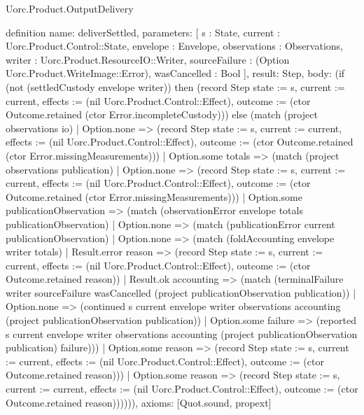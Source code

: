\begin{lexlean}{Uorc.Product.OutputDelivery}
\begin{semanticmodule}
definition{
  name: deliverSettled,
  parameters: [
    s : State,
    current : Uorc.Product.Control::State,
    envelope : Envelope,
    observations : Observations,
    writer : Uorc.Product.ResourceIO::Writer,
    sourceFailure : (Option Uorc.Product.WriteImage::Error),
    wasCancelled : Bool
  ],
  result: Step,
  body: (if (not (settledCustody envelope writer)) then (record Step {state := s, current := current, effects := (nil Uorc.Product.Control::Effect), outcome := (ctor Outcome.retained (ctor Error.incompleteCustody))}) else (match (project observations io)
    | Option.none => (record Step {state := s, current := current, effects := (nil Uorc.Product.Control::Effect), outcome := (ctor Outcome.retained (ctor Error.missingMeasurements))})
    | Option.some totals => (match (project observations publication)
      | Option.none => (record Step {state := s, current := current, effects := (nil Uorc.Product.Control::Effect), outcome := (ctor Outcome.retained (ctor Error.missingMeasurements))})
      | Option.some publicationObservation => (match (observationError envelope totals publicationObservation)
        | Option.none => (match (publicationError current publicationObservation)
          | Option.none => (match (foldAccounting envelope writer totals)
            | Result.error reason => (record Step {state := s, current := current, effects := (nil Uorc.Product.Control::Effect), outcome := (ctor Outcome.retained reason)})
            | Result.ok accounting => (match (terminalFailure writer sourceFailure wasCancelled (project publicationObservation publication))
              | Option.none => (continued s current envelope writer observations accounting (project publicationObservation publication))
              | Option.some failure => (reported s current envelope writer observations accounting (project publicationObservation publication) failure)))
          | Option.some reason => (record Step {state := s, current := current, effects := (nil Uorc.Product.Control::Effect), outcome := (ctor Outcome.retained reason)}))
        | Option.some reason => (record Step {state := s, current := current, effects := (nil Uorc.Product.Control::Effect), outcome := (ctor Outcome.retained reason)}))))),
  axioms: [Quot.sound, propext]
}


\end{semanticmodule}
\end{lexlean}
